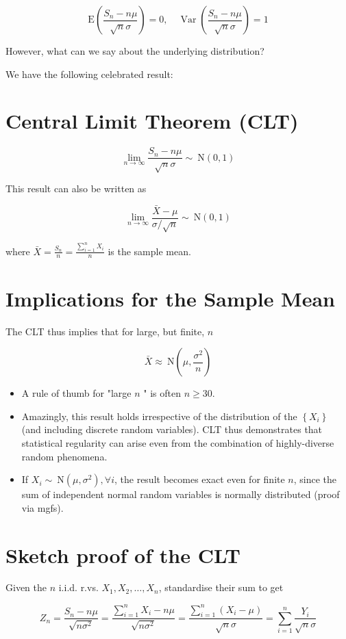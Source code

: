\documentclass[10pt]{article}
\begin{document}
$$
\mathrm{E}\left(\frac{S_{n}-n \mu}{\sqrt{n} \sigma}\right)=0, \quad \operatorname{Var}\left(\frac{S_{n}-n \mu}{\sqrt{n} \sigma}\right)=1
$$

However, what can we say about the underlying distribution?

We have the following celebrated result:

\section*{Central Limit Theorem (CLT)}
$$
\lim _{n \rightarrow \infty} \frac{S_{n}-n \mu}{\sqrt{n} \sigma} \sim \mathrm{~N}(0,1)
$$

This result can also be written as

$$
\lim _{n \rightarrow \infty} \frac{\bar{X}-\mu}{\sigma / \sqrt{n}} \sim \mathrm{~N}(0,1)
$$

where $\bar{X}=\frac{S_{n}}{n}=\frac{\sum_{i=1}^{n} X_{i}}{n}$ is the sample mean.

\section*{Implications for the Sample Mean}
The CLT thus implies that for large, but finite, $n$

$$
\bar{X} \approx \mathrm{~N}\left(\mu, \frac{\sigma^{2}}{n}\right)
$$

\begin{itemize}
  \item A rule of thumb for "large $n$ " is often $n \geq 30$.
  \item Amazingly, this result holds irrespective of the distribution of the $\left\{X_{i}\right\}$ (and including discrete random variables). CLT thus demonstrates that statistical regularity can arise even from the combination of highly-diverse random phenomena.
  \item If $X_{i} \sim \mathrm{~N}\left(\mu, \sigma^{2}\right), \forall i$, the result becomes exact even for finite $n$, since the sum of independent normal random variables is normally distributed (proof via mgfs).
\end{itemize}

\section*{Sketch proof of the CLT}
Given the $n$ i.i.d. r.vs. $X_{1}, X_{2}, \ldots, X_{n}$, standardise their sum to get

$$
Z_{n}=\frac{S_{n}-n \mu}{\sqrt{n \sigma^{2}}}=\frac{\sum_{i=1}^{n} X_{i}-n \mu}{\sqrt{n \sigma^{2}}}=\frac{\sum_{i=1}^{n}\left(X_{i}-\mu\right)}{\sqrt{n} \sigma}=\sum_{i=1}^{n} \frac{Y_{i}}{\sqrt{n} \sigma}
$$
\end{document}
